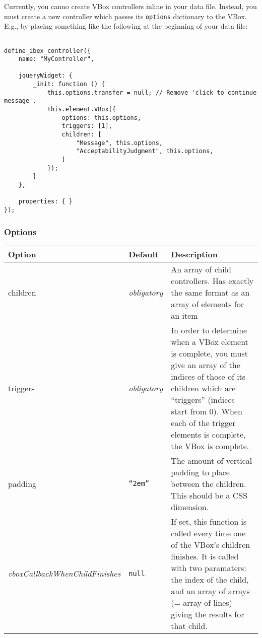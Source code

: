 \documentclass[11pt,letterpaper]{article}
\begin{document}
Currently, you canno create VBox controllers inline in your data file. Instead,
you must create a new controller which passes its \texttt{options} dictionary to the VBox.
E.g., by placing something like the following at the beginning of your data file:
\footnotesize\begin{verbatim}

define_ibex_controller({
    name: "MyController",

    jqueryWidget: {
        _init: function () {
            this.options.transfer = null; // Remove 'click to continue message'.
            this.element.VBox({
                options: this.options,
                triggers: [1],
                children: [
                    "Message", this.options,
                    "AcceptabilityJudgment", this.options,
                ]
            });
        }
    },

    properties: { }
});
\end{verbatim}

\smallskip\noindent\normalsize


\subsubsection*{Options}



\footnotesize
\begin{RaggedRight}
\sloppy
\begin{tabular}{|p{1.0306in}|p{1.0180in}|p{3.4513in}|}
\hline
 \textbf{Option}   &  \textbf{Default}     &  \textbf{Description} \\
\hline
 children   & \textit{ obligatory}   &  An array of child controllers. Has exactly the same format as an array of elements for an item \\
\hline
 triggers   & \textit{ obligatory}   &  In order to determine when a VBox element is complete, you must give an array of the indices of those of its children which are ``triggers'' (indices start from 0). When each of the trigger elements is complete, the VBox is complete. \\
\hline
 padding    &  \texttt{``2em''}       &  The amount of vertical padding to place between the children. This should be a CSS dimension. \\
\hline
\textit{ vboxCallbackWhenChildFinishes } &  \texttt{null}  &  If set, this function is called every time one of the VBox's children finishes. It is called with two paramaters: the index of the child, and an array of arrays (= array of lines) giving the results for that child. 
\\\hline
\end{tabular}
\end{RaggedRight}
\fussy
\end{document}
